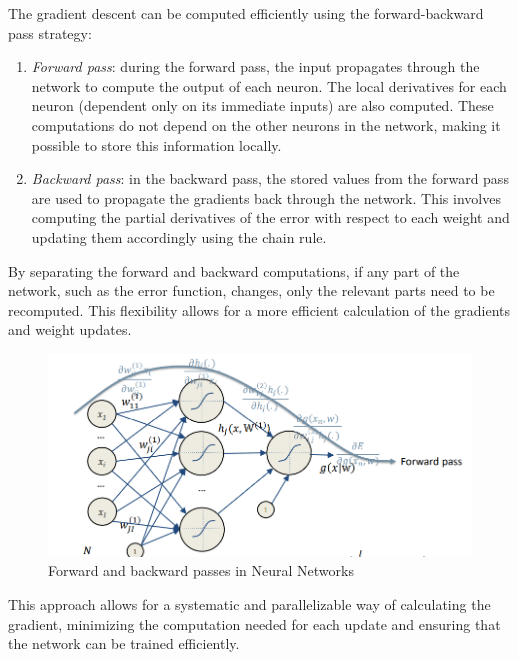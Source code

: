 The gradient descent can be computed efficiently using the forward-backward pass strategy:
\begin{enumerate}
    \item \textit{Forward pass}: during the forward pass, the input propagates through the network to compute the output of each neuron. 
        The local derivatives for each neuron (dependent only on its immediate inputs) are also computed. 
        These computations do not depend on the other neurons in the network, making it possible to store this information locally.
    \item \textit{Backward pass}: in the backward pass, the stored values from the forward pass are used to propagate the gradients back through the network.
        This involves computing the partial derivatives of the error with respect to each weight and updating them accordingly using the chain rule.
\end{enumerate}
By separating the forward and backward computations, if any part of the network, such as the error function, changes, only the relevant parts need to be recomputed. 
This flexibility allows for a more efficient calculation of the gradients and weight updates.
\begin{figure}[H]
    \centering
    \includegraphics[width=0.75\linewidth]{images/bacfor.png}
    \caption{Forward and backward passes in Neural Networks}
\end{figure}
This approach allows for a systematic and parallelizable way of calculating the gradient, minimizing the computation needed for each update and ensuring that the network can be trained efficiently.
